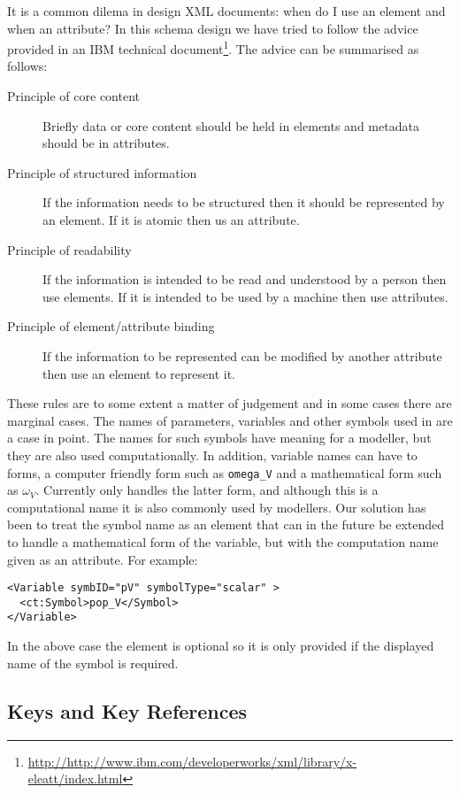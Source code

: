 It is a common dilema in design XML documents: when do I use an
element and when an attribute? In this schema design we have tried to
follow the advice provided in an IBM technical
document\footnote{\url{http://http://www.ibm.com/developerworks/xml/library/x-eleatt/index.html}}. The
advice can be summarised as follows:

\begin{description}
\item[Principle of core content] Briefly data or core content should
  be held in elements and metadata should be in attributes.
\item[Principle of structured information] If the information needs to
  be structured then it should be represented by an element. If it is
  atomic then us an attribute.
\item[Principle of readability] If the information is intended to be
  read and understood by a person then use elements. If it is intended
  to be used by a machine then use attributes.
\item[Principle of element/attribute binding] If the information to be
  represented can be modified by another attribute then use an element
  to represent it.
\end{description}

These rules are to some extent a matter of judgement and in some cases
there are marginal cases. The names of parameters, variables and other
symbols used in \pharmml are a case in point. The names for such
symbols have meaning for a modeller, but they are also used
computationally. In addition, variable names can have to forms, a
computer friendly form such as \texttt{omega\_V} and a mathematical
form such as $\omega_V$. Currently \pharmml only handles the latter
form, and although this is a computational name it is also commonly
used by modellers. Our solution has been to treat the symbol name as
an element that can in the future be extended to handle a mathematical
form of the variable, but with the computation name given as an
attribute. For example:

\lstset{language=XML}
\begin{lstlisting}
<Variable symbID="pV" symbolType="scalar" >
  <ct:Symbol>pop_V</Symbol>
</Variable>
\end{lstlisting}

In the above case the  element is optional so it is
only provided if the displayed name of the symbol is
required.

\subsection{Keys and Key References}

